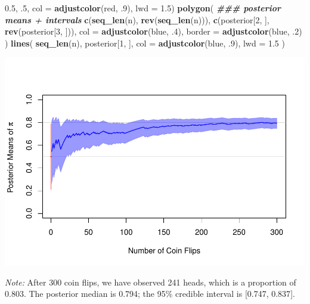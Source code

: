 \documentclass[
  11pt,
]{article}
\newenvironment{Shaded}{\begin{snugshade}}{\end{snugshade}}
\newcommand{\AttributeTok}[1]{\textcolor[rgb]{0.13,0.29,0.53}{#1}}
\newcommand{\DecValTok}[1]{\textcolor[rgb]{0.00,0.00,0.81}{#1}}
\newcommand{\DocumentationTok}[1]{\textcolor[rgb]{0.56,0.35,0.01}{\textbf{\textit{#1}}}}
\newcommand{\FloatTok}[1]{\textcolor[rgb]{0.00,0.00,0.81}{#1}}
\newcommand{\FunctionTok}[1]{\textcolor[rgb]{0.13,0.29,0.53}{\textbf{#1}}}
\newcommand{\NormalTok}[1]{#1}
\newcommand{\StringTok}[1]{\textcolor[rgb]{0.31,0.60,0.02}{#1}}
\begin{document}
\begin{Shaded}
\begin{Highlighting}[]
         \FloatTok{0.5}\NormalTok{, .}\DecValTok{5}\NormalTok{,}
         \AttributeTok{col =} \FunctionTok{adjustcolor}\NormalTok{(}\StringTok{\textquotesingle{}red\textquotesingle{}}\NormalTok{, .}\DecValTok{9}\NormalTok{),}
         \AttributeTok{lwd =} \FloatTok{1.5}\NormalTok{)}
\FunctionTok{polygon}\NormalTok{(                             }\DocumentationTok{\#\#\# posterior means + intervals}
  \FunctionTok{c}\NormalTok{(}\FunctionTok{seq\_len}\NormalTok{(n), }\FunctionTok{rev}\NormalTok{(}\FunctionTok{seq\_len}\NormalTok{(n))),}
  \FunctionTok{c}\NormalTok{(posterior[}\DecValTok{2}\NormalTok{, ], }\FunctionTok{rev}\NormalTok{(posterior[}\DecValTok{3}\NormalTok{, ])),}
  \AttributeTok{col =} \FunctionTok{adjustcolor}\NormalTok{(}\StringTok{\textquotesingle{}blue\textquotesingle{}}\NormalTok{, .}\DecValTok{4}\NormalTok{),}
  \AttributeTok{border =} \FunctionTok{adjustcolor}\NormalTok{(}\StringTok{\textquotesingle{}blue\textquotesingle{}}\NormalTok{, .}\DecValTok{2}\NormalTok{)}
\NormalTok{)}
\FunctionTok{lines}\NormalTok{(}
  \FunctionTok{seq\_len}\NormalTok{(n),}
\NormalTok{  posterior[}\DecValTok{1}\NormalTok{, ],}
  \AttributeTok{col =} \FunctionTok{adjustcolor}\NormalTok{(}\StringTok{\textquotesingle{}blue\textquotesingle{}}\NormalTok{, .}\DecValTok{9}\NormalTok{),}
  \AttributeTok{lwd =} \FloatTok{1.5}
\NormalTok{)}
\end{Highlighting}
\end{Shaded}

\begin{center}\includegraphics[width=0.75\linewidth]{01-02-lec_files/figure-latex/coin-sim2-1} \end{center}

\emph{Note:} After 300 coin flips, we have observed 241 heads, which is a
proportion of 0.803. The posterior median is
0.794; the 95\% credible interval
is {[}0.747,
0.837{]}.
\end{document}
